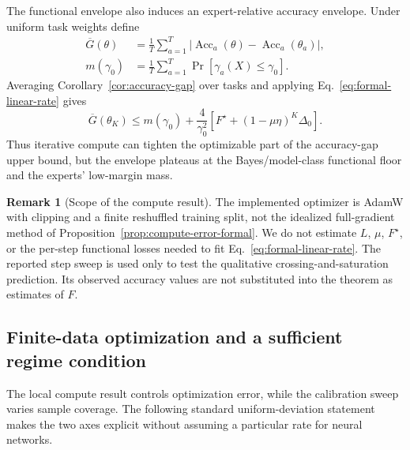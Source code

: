 \documentclass[letterpaper]{article} %
\theoremstyle{plain}
\theoremstyle{definition}
\newtheorem{remark}[theorem]{Remark}
\begin{document}
The functional envelope also induces an expert-relative accuracy envelope.
Under uniform task weights define
\begin{align}
\overline G(\theta)
&=\frac1T\sum_{a=1}^T
\left|\operatorname{Acc}_a(\theta)-\operatorname{Acc}_a(\theta_a)\right|,\\
m(\gamma_0)
&=\frac1T\sum_{a=1}^T\Pr[\gamma_a(X)\le\gamma_0].
\end{align}
Averaging Corollary~\ref{cor:accuracy-gap} over tasks and applying Eq.~\eqref{eq:formal-linear-rate} gives
\begin{equation}
\overline G(\theta_K)
\le
m(\gamma_0)
+\frac{4}{\gamma_0^2}
\left[F^\star+(1-\mu\eta)^K\Delta_0\right].
\label{eq:accuracy-compute-envelope}
\end{equation}
Thus iterative compute can tighten the optimizable part of the accuracy-gap upper bound, but the envelope plateaus at the Bayes/model-class functional floor and the experts' low-margin mass.

\begin{remark}[Scope of the compute result]
The implemented optimizer is AdamW with clipping and a finite reshuffled training split, not the idealized full-gradient method of Proposition~\ref{prop:compute-error-formal}.
We do not estimate $L$, $\mu$, $F^\star$, or the per-step functional losses needed to fit Eq.~\eqref{eq:formal-linear-rate}.
The reported step sweep is used only to test the qualitative crossing-and-saturation prediction.
Its observed accuracy values are not substituted into the theorem as estimates of $F$.
\end{remark}


\subsection{Finite-data optimization and a sufficient regime condition}
\label{app:finite-data-regime}

The local compute result controls optimization error, while the calibration sweep varies sample coverage.
The following standard uniform-deviation statement makes the two axes explicit without assuming a particular rate for neural networks.
\end{document}
